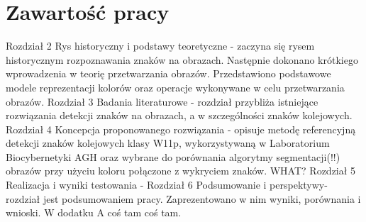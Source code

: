 

\section{Zawartość pracy}
\label{sec:zawartoscPracy}

Rozdział 2 Rys historyczny i podstawy teoretyczne - zaczyna się rysem historycznym rozpoznawania znaków na obrazach. Następnie dokonano krótkiego wprowadzenia w teorię przetwarzania obrazów. Przedstawiono podstawowe modele reprezentacji kolorów oraz operacje wykonywane w celu przetwarzania obrazów.
Rozdział 3 Badania literaturowe - rozdział przybliża istniejące rozwiązania detekcji znaków na obrazach, a w szczególności znaków kolejowych.
Rozdział 4 Koncepcja proponowanego rozwiązania - opisuje metodę referencyjną detekcji znaków kolejowych klasy W11p, wykorzystywaną w Laboratorium Biocybernetyki AGH oraz wybrane do porównania algorytmy segmentacji(!!) obrazów przy użyciu koloru połączone z wykryciem znaków. WHAT?
Rozdział 5 Realizacja i wyniki testowania - 
Rozdział 6 Podsumowanie i perspektywy- rozdział jest podsumowaniem pracy. Zaprezentowano w nim wyniki, porównania i wnioski.
W dodatku A coś tam coś tam.
